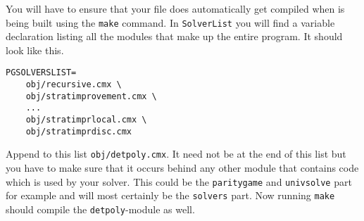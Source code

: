 You will have to ensure that your file does automatically get compiled when \pgsolver is being built using
the \texttt{make} command. In \texttt{SolverList} you will find a variable declaration listing all the modules
that make up the entire program. It should look like this.
\begin{verbatim}
PGSOLVERSLIST=
	obj/recursive.cmx \
	obj/stratimprovement.cmx \
	...
	obj/stratimprlocal.cmx \
	obj/stratimprdisc.cmx 
\end{verbatim}
Append to this list \texttt{obj/detpoly.cmx}. It need not be at the end of this list but you have to make
sure that it occurs behind any other module that contains code which is used by your solver. This could
be the \texttt{paritygame} and \texttt{univsolve} part for example and will most certainly be the
\texttt{solvers} part. Now running \texttt{make} should compile the \texttt{detpoly}-module as well.

